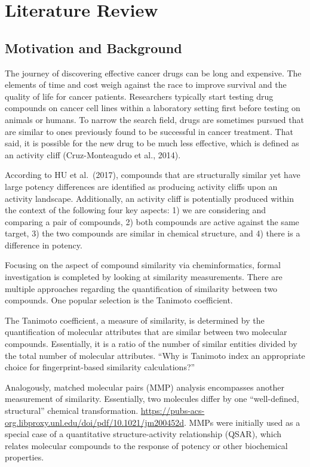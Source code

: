 \documentclass[print]{nuthesis}
\begin{document}
\hypertarget{literature-review}{%
\chapter{Literature Review}\label{literature-review}}

\hypertarget{motivation-and-background}{%
\section{Motivation and Background}\label{motivation-and-background}}

The journey of discovering effective cancer drugs can be long and expensive. The elements of time and cost weigh against the race to improve survival and the quality of life for cancer patients. Researchers typically start testing drug compounds on cancer cell lines within a laboratory setting first before testing on animals or humans. To narrow the search field, drugs are sometimes pursued that are similar to ones previously found to be successful in cancer treatment. That said, it is possible for the new drug to be much less effective, which is defined as an activity cliff (Cruz-Monteagudo et al., 2014).

According to HU et al.~(2017), compounds that are structurally similar yet have large potency differences are identified as producing activity cliffs upon an activity landscape. Additionally, an activity cliff is potentially produced within the context of the following four key aspects: 1) we are considering and comparing a pair of compounds, 2) both compounds are active against the same target, 3) the two compounds are similar in chemical structure, and 4) there is a difference in potency.

Focusing on the aspect of compound similarity via cheminformatics, formal investigation is completed by looking at similarity measurements. There are multiple approaches regarding the quantification of similarity between two compounds. One popular selection is the Tanimoto coefficient.

The Tanimoto coefficient, a measure of similarity, is determined by the quantification of molecular attributes that are similar between two molecular compounds. Essentially, it is a ratio of the number of similar entities divided by the total number of molecular attributes. ``Why is Tanimoto index an appropriate choice for fingerprint-based similarity calculations?''

Analogously, matched molecular pairs (MMP) analysis encompasses another measurement of similarity. Essentially, two molecules differ by one ``well-defined, structural'' chemical transformation. \url{https://pubs-acs-org.libproxy.unl.edu/doi/pdf/10.1021/jm200452d}. MMPs were initially used as a special case of a quantitative structure-activity relationship (QSAR), which relates molecular compounds to the response of potency or other biochemical properties.
\end{document}
